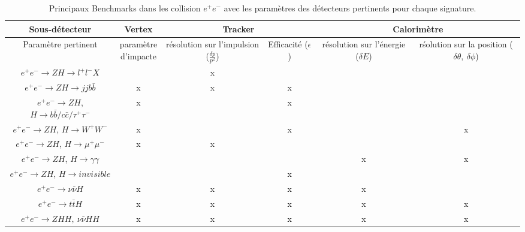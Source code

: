 \makeatletter
\setlength{\@fptop}{5pt}
\begin{table}[H]
  \small
  \centering
  \begin{tabular}{|c|c|c|c|c|c|}
    \hline 
    Sous-détecteur & Vertex & \multicolumn{2}{|c|}{Tracker} & \multicolumn{2}{|c|}{Calorim\`etre}\\
    \hline 
          Paramètre pertinent    & \pbox{20cm}{param\`etre\\d'impacte} & \pbox{20cm}{r\'esolution\\sur l'impulsion\\($\frac{\delta p}{p^2}$)}  & \pbox{20cm}{Efficacit\'e\\ ($\epsilon$)} & \pbox{20cm}{r\'esolution\\sur l'\'energie\\($\delta{E}$)}  & \pbox{20cm}{r\'solution\\sur la position\\($\delta{\theta},\ \delta{\phi}$)} \\
    \hline 
$e^{+}e^{-}{\rightarrow}ZH{\rightarrow}l^{+}l^{-}X$ &   & x &   &  & \\
$e^{+}e^{-}{\rightarrow}ZH{\rightarrow}jjb\bar{b}$ & x & x & x &  & \\
$e^{+}e^{-}{\rightarrow}ZH$, $H{\rightarrow}b\bar{b}/c\bar{c}/\tau^+\tau^-$ & x &  & x &  & \\
$e^{+}e^{-}{\rightarrow}ZH$, $H{\rightarrow}W^+W^-$ & x &  & x &  & x \\
$e^{+}e^{-}{\rightarrow}ZH$, $H{\rightarrow}\mu^+\mu^-$ & x & x & & &  \\
$e^{+}e^{-}{\rightarrow}ZH$, $H{\rightarrow}\gamma\gamma$ &   &   &  & x & x \\
$e^{+}e^{-}{\rightarrow}ZH$, $H{\rightarrow}invisible$ &   &   & x &  &  \\
$e^{+}e^{-}{\rightarrow}\nu\bar{\nu}{H}$ & x & x & x & x &  \\
$e^{+}e^{-}{\rightarrow}t\bar{t}H$ & x & x & x & x & x \\
$e^{+}e^{-}{\rightarrow}ZHH,\ \nu\bar{\nu}{HH}$ & x & x & x & x & x \\
    \hline    
  \end{tabular}
  \caption{Principaux Benchmarks dans les collision $e^{+}e^{-}$ avec les param\`etres des d\'etecteurs pertinents pour chaque signature.}
  \label{table:2.1}
\end{table}